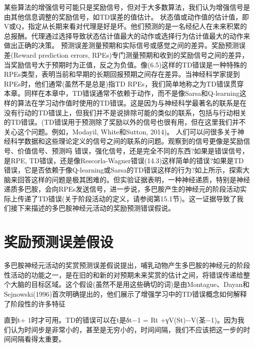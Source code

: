 某些算法的增强信号可能只是奖励信号，但对于大多数算法，我们认为增强信号是由其他信息调整的奖励信号，如TD误差的值估计。
状态值或动作值的估计值，即V或Q，指定从长期来看对代理是好是坏。他们预测的是一名经纪人在未来积累的总报酬。代理通过选择导致状态估计值最大的动作或选择行为估计值最大的动作来做出正确的决策。
预测误差测量预期和实际信号或感觉之间的差异。奖励预测误差(Reward prediction errors, RPEs)专门测量预期和收到的奖励信号之间的差异，当奖励信号大于预期时为正值，反之为负值。像(6.5)这样的TD错误是一种特殊的RPEs类型，表明当前和早期的长期回报预期之间存在差异。当神经科学家提到RPEs时，他们通常(虽然不是总是)指TD RPEs，我们简单地称之为TD错误贯穿本章。同样在本章中，TD错误通常不依赖于动作，而不是像Sarsa和Q-learning这样的算法在学习动作值时使用的TD错误。这是因为与神经科学最著名的联系是在没有行动的TD错误上，但我们并不是说排除可能的类似的联系，包括与行动相关的TD错误。(TD错误用于预测除了奖励以外的信号也很有用，但在这里我们并不关心这个问题。例如，Modayil, White和Sutton, 2014)。
人们可以问很多关于神经科学数据和这些理论定义的信号之间的联系的问题。观察到的信号更像是奖励信号、价值信号、预测吗
错误，强化信号，还是完全不同的东西?如果是错误信号，是RPE, TD错误，还是像Rescorla-Wagner错误(14.3)这样简单的错误?如果是TD错误，它是否依赖于像Q-learning或Sarsa的TD错误这样的行为?如上所示，探索大脑来回答这样的问题是极其困难的。但实验证据表明，一种神经递质，特别是神经递质多巴胺，会向RPEs发送信号，进一步说，多巴胺产生的神经元的阶段活动实际上传递了TD错误(关于阶段活动的定义，请参阅第15.1节)。这一证据导致了我们接下来描述的多巴胺神经元活动的奖励预测错误假说。


\section{奖励预测误差假设}

多巴胺神经元活动的奖赏预测误差假说提出，哺乳动物产生多巴胺的神经元的阶段性活动的功能之一，是在旧的和新的对预期未来奖赏的估计之间，将错误传递给整个大脑的目标区域。这个假设(虽然不是用这些确切的词)是由Montague、Dayan和Sejnowski(1996)首次明确提出的，他们展示了增强学习中的TD错误概念如何解释了阶段性的许多特征

直到t+ 1时才可用。TD的错误可以在t是δt−1 = Rt +γV(St)−V(圣−1)。因为我们认为时间步是非常小的，甚至是无穷小的，时间间隔，我们不应该把这一步的时间间隔看得太重要。

